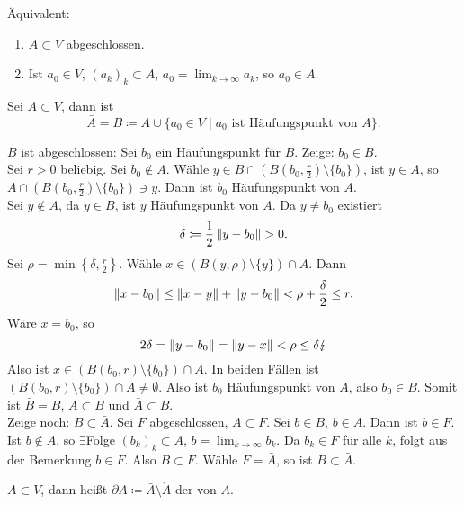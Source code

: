 \begin{bemerkung*}
	\"Aquivalent:
	\begin{enumerate}
		\item $ A\subset V $ abgeschlossen.
		\item Ist $ a_0\in V $, $ (a_k)_k\subset A $, $ a_0=\lim_{k\to\infty}a_k $, so $ a_0\in A $.
	\end{enumerate}
\end{bemerkung*}
\begin{lemma}
	Sei $ A\subset V $, dann ist \[ \bar A=B\coloneqq A\cup\lbrace a_0\in V\mid a_0\text{ ist H\"aufungspunkt von }A\rbrace. \]
\end{lemma}
\newpage
\begin{beweis}
	$ B $ ist abgeschlossen: Sei $ b_0 $ ein H\"aufungspunkt f\"ur $ B $. Zeige: $b_0\in B $.\\
	Sei $ r>0 $ beliebig. Sei $ b_0\notin A $. W\"ahle $ y\in B\cap\left(B\left(b_0,\frac{r}{2}\right)\setminus \lbrace b_0\rbrace\right) $, ist $ y\in A $, so $ A\cap\left(B\left(b_0,\frac{r}{2}\right)\setminus\lbrace b_0\rbrace\right)\ni y $. Dann ist $ b_0 $ H\"aufungspunkt von $ A $.\\
	Sei $ y\notin A $, da $ y\in B $, ist $ y $ H\"aufungspunkt von $ A $. Da $ y\neq b_0 $ existiert
	\[ \delta\coloneqq\frac{1}{2}\norm{y-b_0}>0. \]
	Sei $ \rho=\min\left\lbrace\delta,\frac{r}{2}\right\rbrace $. W\"ahle $ x\in (B(y,\rho)\setminus\lbrace y\rbrace)\cap A $. Dann
	\[ \left\|x-b_0\right\|\leq\left\|x-y\right\|+\left\|y-b_0\right\|<\rho+\frac{\delta}{2}\leq r. \]
	W\"are $ x=b_0 $, so
	\[ 2\delta=\left\|y-b_0\right\|=\left\|y-x\right\|<\rho\leq\delta\lightning \]
	Also ist $ x\in (B(b_0,r)\setminus\lbrace b_0\rbrace)\cap A $. In beiden F\"allen ist $ (B(b_0,r)\setminus\lbrace b_0\rbrace)\cap A\neq\emptyset $. Also ist $ b_0 $ H\"aufungspunkt von $ A $, also $ b_0\in B $. Somit ist $ \bar B=B $, $ A\subset B $ und $ \bar A\subset B $.\\
	Zeige noch: $ B\subset\bar A $. 
	Sei $ F $ abgeschlossen, $ A\subset F $. Sei $ b\in B $, $ b\in A $. Dann ist $ b\in F $. Ist $ b\notin A $, so $ \exists $Folge $ (b_k)_k\subset A $, $ b=\lim_{k\to\infty}b_k $. Da $ b_k\in F $ f\"ur alle $ k $, folgt aus der Bemerkung $ b\in F $. Also $ B\subset F $. W\"ahle $ F=\bar A $, so ist $ B\subset\bar A $.
\end{beweis}
\begin{definition}
	$ A\subset V $, dann hei\ss t $ \partial A\coloneqq\bar A\setminus\mathring A $ der  von $ A $.
\end{definition}

